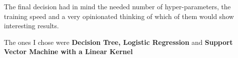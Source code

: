 \documentclass{article}
\begin{document}
    The final decision had in mind the needed number of hyper-parameters, the
    training speed and a very opinionated thinking of which of them would show
    interesting results.

    The ones I chose were \textbf{Decision Tree, Logistic Regression} and
    \textbf{Support Vector Machine with a Linear Kernel}
\end{document}
